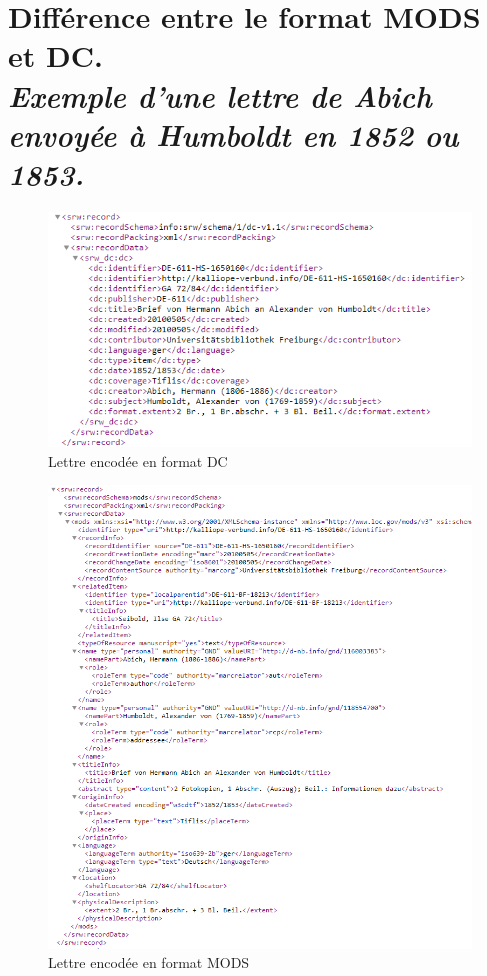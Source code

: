 \documentclass[a4paper, 12pt, twoside]{book}
\newcommand\ChapterSub[2]{
  \chapter[#1: {\itshape#2}]{#1\\[2ex]\Large\itshape#2}}
\begin{document}
\ChapterSub{Différence entre le format MODS et DC.}{Exemple d'une lettre de Abich envoyée à Humboldt en 1852 ou 1853.}
\label{annexe:MODSetDC}
\begin{figure}[h!]
    \centering
         \includegraphics[width=16cm]{img/dc_letter_kalliope.png}
         \caption{Lettre encodée en format DC}
         \label{fig:DC}
\end{figure}
\begin{figure}[h!]
    \centering
         \includegraphics[width=16cm]{img/mods_kalliope.png}
         \caption{Lettre encodée en format MODS}
         \label{fig:MODS}
\end{figure}
\end{document}
